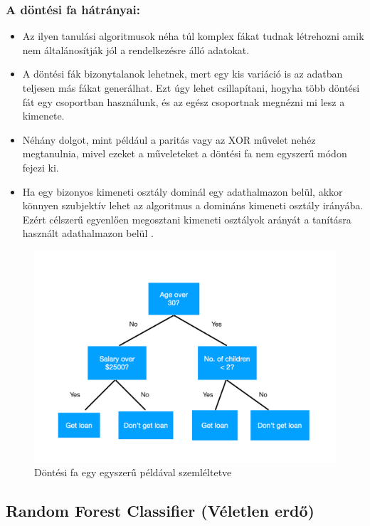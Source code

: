 \subsubsection{A döntési fa hátrányai:}
\begin{itemize}
    \item Az ilyen tanulási algoritmusok néha túl komplex fákat tudnak létrehozni amik nem általánosítják jól a rendelkezésre álló adatokat.
    \item A döntési fák bizonytalanok lehetnek, mert egy kis variáció is az adatban teljesen más fákat generálhat. Ezt úgy lehet csillapítani, hogyha több döntési fát egy csoportban használunk, és az egész csoportnak megnézni mi lesz a kimenete.
    \item Néhány dolgot, mint például a paritás vagy az XOR művelet nehéz megtanulnia, mivel ezeket a műveleteket a döntési fa nem egyszerű módon fejezi ki.
    \item Ha egy bizonyos kimeneti osztály dominál egy adathalmazon belül, akkor könnyen szubjektív lehet az algoritmus a domináns kimeneti osztály irányába. Ezért célszerű egyenlően megosztani kimeneti osztályok arányát a tanításra használt adathalmazon belül \cite{dontesi_fa_2}. 
\end{itemize}
\begin{figure}[h]
    \centering
    \includegraphics[width=\linewidth]{images/3.fejezet/DecisionTree.png}
    \caption{Döntési fa egy egyszerű példával szemléltetve \cite{dontesifa_abra}}
    \label{fig:dontesifa}
\end{figure}

\subsection{Random Forest Classifier (Véletlen erdő)}

